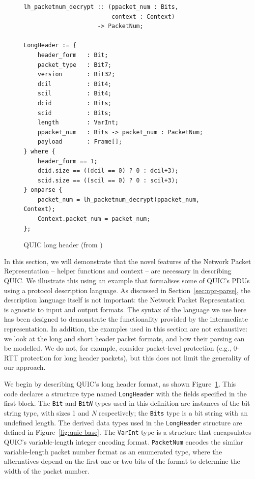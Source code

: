 \documentclass[10pt,sigconf]{acmart}
\begin{document}
\begin{figure}
	\vspace{3mm}
    \begin{BVerbatim}[fontsize=\scriptsize]
lh_packetnum_decrypt :: (ppacket_num : Bits, 
                         context : Context) 
                     -> PacketNum;

LongHeader := {
	header_form   : Bit;
	packet_type   : Bit7;
	version       : Bit32;
	dcil          : Bit4;
	scil          : Bit4;
	dcid          : Bits;
	scid          : Bits;
	length        : VarInt;
	ppacket_num   : Bits -> packet_num : PacketNum;
	payload       : Frame[];
} where {
	header_form == 1;
	dcid.size == ((dcil == 0) ? 0 : dcil+3);
	scid.size == ((scil == 0) ? 0 : scil+3);
} onparse {
	packet_num = lh_packetnum_decrypt(ppacket_num, Context);
	Context.packet_num = packet_num;
};
    \end{BVerbatim}
    \caption{QUIC long header (from \cite{draft-ietf-quic-transport-latest})}
    \label{fig:quic-long-hdr-desc}
\end{figure}

In this section, we will demonstrate that the novel features of the Network Packet Representation
 -- helper functions and context -- are necessary in describing QUIC. We illustrate
this using an example that formalises some of QUIC's PDUs using a protocol description
language. As discussed in Section~\ref{sec:npr-parse}, the description language itself is not important: the
Network Packet Representation is agnostic to input and output formats. The syntax of the
language we use here has been designed to demonstrate the functionality provided by the
intermediate representation. In addition, the examples used in this section are not exhaustive:
we look at the long and short header packet formats, and how their parsing
can be modelled. We do not, for example, consider packet-level protection (e.g., 0-RTT protection for
long header packets), but this does not limit the generality of our approach.

We begin by describing QUIC's long header
format, as shown Figure~\ref{fig:quic-long-hdr-desc}. This code declares a structure type
named \texttt{LongHeader} with the fields specified in the first block. The \texttt{Bit}
and \texttt{Bit\emph{N}} types used in this definition are instances
of the bit string type, with sizes 1 and \emph{N} respectively; the \texttt{Bits} type is a bit 
string with an undefined length. The derived data types 
used in the \texttt{LongHeader} structure are defined in Figure~\ref{fig:quic-base}. The
\texttt{VarInt} type is a structure that encapsulates QUIC's variable-length integer
encoding format. \texttt{PacketNum} encodes the similar variable-length packet number
format as an enumerated type, where the alternatives depend on the first one or two bits of the
format to determine the width of the packet number.
\end{document}
